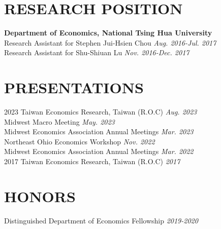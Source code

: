 \documentclass[10pt]{res} %
\begin{document}
\begin{resume}

\section{RESEARCH POSITION}%
\label{sec:research_position}

\vspace{8pt} %

{\bf Department of Economics, National Tsing Hua University} \\
Research Assistant for Stephen Jui-Hsien Chou \hfill  \textit{Aug. 2016-Jul. 2017} \\
Research Assistant for Shu-Shiuan Lu \hfill  \textit{Nov. 2016-Dec. 2017} \\

\vspace{-10pt}

\section{PRESENTATIONS}%
\label{sub:conference_paper}
2023 Taiwan Economics Research, Taiwan (R.O.C) \hfill  \textit{Aug. 2023} \\
Midwest Macro Meeting \hfill \textit{May. 2023} \\
Midwest Economics Association Annual Meetings \hfill \textit{Mar. 2023} \\
Northeast Ohio Economics Workshop \hfill \textit{Nov. 2022} \\
Midwest Economics Association Annual Meetings \hfill \textit{Mar. 2022} \\
2017 Taiwan Economics Research, Taiwan (R.O.C) \hfill  \textit{2017} \\

\vspace{-10pt}

\section{HONORS}
Distinguished Department of Economics Fellowship \hfill  \textit{2019-2020}\\


\end{resume}
\end{document}
